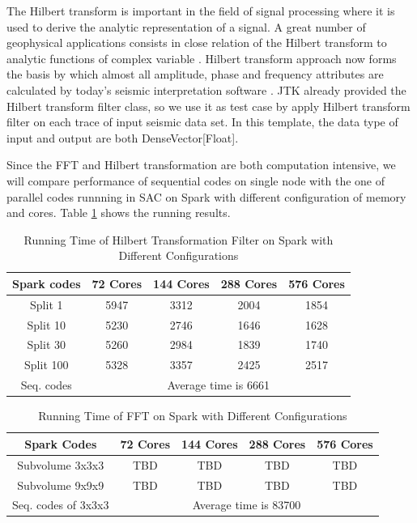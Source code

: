 The Hilbert transform \cite{HilbertWiki} is important in the field of signal processing where it is used to derive the analytic representation of a signal. A great number of geophysical applications consists in close relation of the Hilbert transform to analytic functions of complex variable \cite{HilbertGeoApplication}. Hilbert transform approach now forms the basis by which almost all amplitude, phase and frequency attributes are calculated by today’s seismic interpretation software \cite{HilbertSeismic}. JTK already provided the Hilbert transform filter class, so we use it as test case by apply Hilbert transform filter on each trace of input seismic data set. In this template, the data type of input and output are both DenseVector[Float].  

Since the FFT and Hilbert transformation are both computation intensive, we will compare performance of sequential codes on single node with the one of parallel codes runnning in SAC on Spark with different configuration of memory and cores. Table \ref{table:HilbertSpark} shows the running results.


\begin{table}[H]
\caption{Running Time of Hilbert Transformation Filter on Spark with Different Configurations}
\centering
\begin{tabular}{||c| c c c c ||} 
 \hline
 Spark codes  & 72 Cores & 144 Cores & 288 Cores & 576 Cores \\ [0.5ex] 
 \hline
  Split 1   & 5947 & 3312 & 2004 & 1854 \\
  Split 10  & 5230 & 2746 & 1646 & 1628 \\
  Split 30  & 5260 & 2984 & 1839 & 1740 \\
  Split 100 & 5328 & 3357 & 2425 & 2517 \\
 \hline
 \hline
 Seq. codes & \multicolumn{4}{c||}{Average time is 6661} \\ 
 \hline
\end{tabular}
\label{table:HilbertSpark}
\end{table}

\begin{table}[H]
\caption{Running Time of FFT on Spark with Different Configurations}
\centering
\begin{tabular}{||c| c c c c ||} 
 \hline
 Spark Codes & 72 Cores & 144 Cores & 288 Cores & 576 Cores \\ [0.5ex] 
 \hline
 Subvolume 3x3x3 & TBD & TBD & TBD & TBD \\ 
 Subvolume 9x9x9 & TBD & TBD & TBD & TBD \\ 
 \hline
 \hline
 Seq. codes of 3x3x3 & \multicolumn{4}{c||}{Average time is 83700 } \\ 
 \hline
 \end{tabular}
 \label{table:FFTSpark}
 \end{table}

